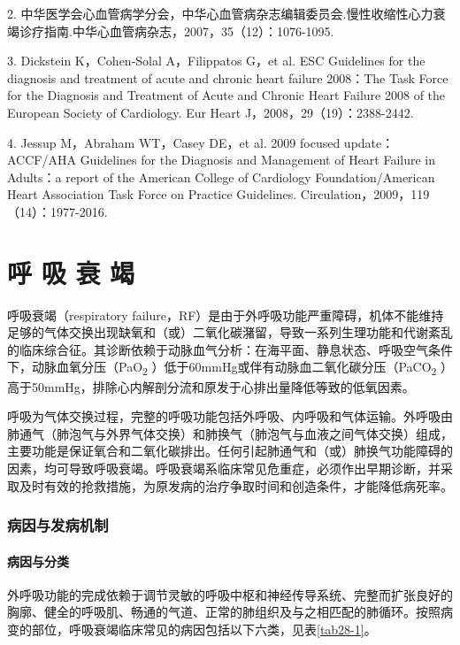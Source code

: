2.
中华医学会心血管病学分会，中华心血管病杂志编辑委员会.慢性收缩性心力衰竭诊疗指南.中华心血管病杂志，2007，35（12）：1076-1095.

3. Dickstein K，Cohen-Solal A，Filippatos G，et al. ESC Guidelines for
the diagnosis and treatment of acute and chronic heart failure 2008：The
Task Force for the Diagnosis and Treatment of Acute and Chronic Heart
Failure 2008 of the European Society of Cardiology. Eur Heart
J，2008，29（19）：2388-2442.

4. Jessup M，Abraham WT，Casey DE，et al. 2009 focused update：ACCF/AHA
Guidelines for the Diagnosis and Management of Heart Failure in
Adults：a report of the American College of Cardiology
Foundation/American Heart Association Task Force on Practice Guidelines.
Circulation，2009，119（14）：1977-2016.

\protect\hypertarget{text00076.html}{}{}

\chapter{呼 吸 衰 竭}

呼吸衰竭（respiratory
failure，RF）是由于外呼吸功能严重障碍，机体不能维持足够的气体交换出现缺氧和（或）二氧化碳潴留，导致一系列生理功能和代谢紊乱的临床综合征。其诊断依赖于动脉血气分析：在海平面、静息状态、呼吸空气条件下，动脉血氧分压（PaO\textsubscript{2}
）低于60mmHg或伴有动脉血二氧化碳分压（PaCO\textsubscript{2}
）高于50mmHg，排除心内解剖分流和原发于心排出量降低等致的低氧因素。

呼吸为气体交换过程，完整的呼吸功能包括外呼吸、内呼吸和气体运输。外呼吸由肺通气（肺泡气与外界气体交换）和肺换气（肺泡气与血液之间气体交换）组成，主要功能是保证氧合和二氧化碳排出。任何引起肺通气和（或）肺换气功能障碍的因素，均可导致呼吸衰竭。呼吸衰竭系临床常见危重症，必须作出早期诊断，并采取及时有效的抢救措施，为原发病的治疗争取时间和创造条件，才能降低病死率。

\subsection{病因与发病机制}

\subsubsection{病因与分类}

外呼吸功能的完成依赖于调节灵敏的呼吸中枢和神经传导系统、完整而扩张良好的胸廓、健全的呼吸肌、畅通的气道、正常的肺组织及与之相匹配的肺循环。按照病变的部位，呼吸衰竭临床常见的病因包括以下六类，见表\ref{tab28-1}。

